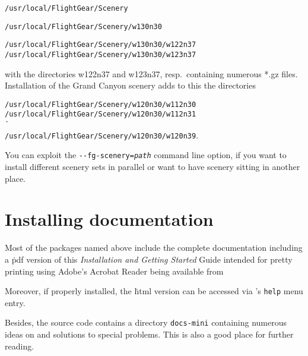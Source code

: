 \noindent
 \texttt{/usr/local/FlightGear/Scenery}

\noindent
 \texttt{/usr/local/FlightGear/Scenery/w130n30}

\noindent
 \texttt{/usr/local/FlightGear/Scenery/w130n30/w122n37}\\
 \texttt{/usr/local/FlightGear/Scenery/w130n30/w123n37}
 \medskip

\noindent 
 with the directories w122n37 and w123n37, resp.\ containing numerous *.gz
files. Installation of the Grand Canyon scenery adds to this the directories
\medskip

\noindent
 \texttt{/usr/local/FlightGear/Scenery/w120n30/w112n30}\\
 \texttt{/usr/local/FlightGear/Scenery/w120n30/w112n31}\\
 \texttt{\.\.\.}\\
 \texttt{/usr/local/FlightGear/Scenery/w120n30/w120n39}.
 \medskip

You can exploit the \texttt{-$ $-fg-scenery={\it path}} command line option, if you want to install different scenery sets in parallel or want to have scenery sitting in another place.

\section{Installing documentation}

Most of the packages named above include the complete \FlightGear{} documentation
including a \.pdf version of this \textit{Installation and Getting Started} Guide intended
for pretty printing using Adobe's Acrobat Reader being available from
 \medskip

 \medskip

 \noindent
 Moreover, if properly installed, the \.html version can be accessed via
\FlightGear{}'s \texttt{help} menu entry.

Besides, the source code contains a directory \texttt{docs-mini} containing numerous
ideas on and solutions to special problems. This is also a good place for further
reading.

